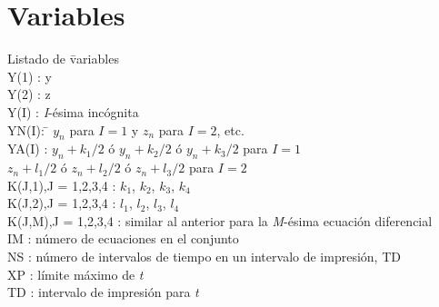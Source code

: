 \documentclass[12pt]{article}
\begin{document}
\section{Variables}
\begin{tabbing}
Listado de \= variables \\
\> Y(1) : y \\
\> Y(2) : z \\
\> Y(I) : \textit{I}-ésima incógnita \\
\> YN(I): \= $y_{n}$ para $I=1$ y $z_{n}$ para $I=2$, etc. \\
\> YA(I) : $y_{n}+k_{1}/2$ ó $y_{n}+k_{2}/2$ ó $y_{n}+k_{3}/2$ para $I=1$ \\
\> \> $z_{n}+l_{1}/2$ ó $z_{n}+l_{2}/2$ ó $z_{n}+l_{3}/2$ para $I=2$ \\
\> K(J,1),J = 1,2,3,4 : $k_{1}$, $k_{2}$, $k_{3}$, $k_{4}$ \\
\> K(J,2),J = 1,2,3,4 : $l_{1}$, $l_{2}$, $l_{3}$, $l_{4}$ \\
\> K(J,M),J = 1,2,3,4 : similar al anterior para la \textit{M}-ésima ecuación diferencial \\
\> IM : número de ecuaciones en el conjunto \\
\> NS : número de intervalos de tiempo en un intervalo de impresión, TD \\
\> XP : límite máximo de \textit{t} \\
\> TD : intervalo de impresión para \textit{t}
\end{tabbing}
\end{document}
